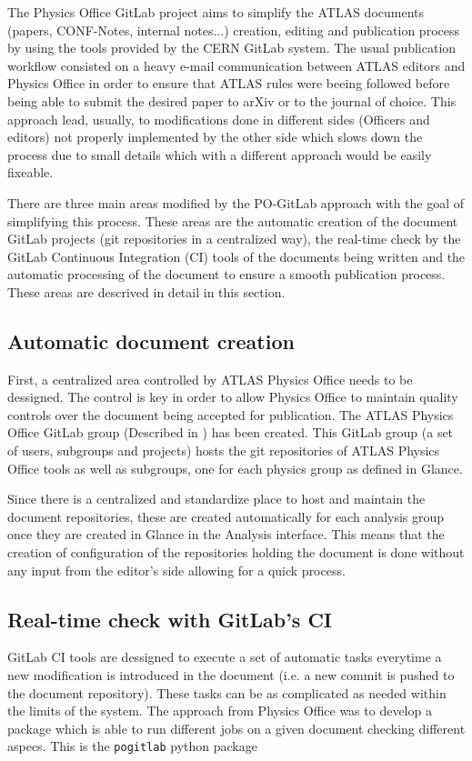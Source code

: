 The Physics Office GitLab project aims to simplify the ATLAS documents (papers, CONF-Notes, internal notes...) creation, editing and publication process by using the tools provided by the CERN GitLab system. The usual publication workflow consisted on a heavy e-mail communication between ATLAS editors and Physics Office in order to ensure that ATLAS rules were beeing followed before being able to submit the desired paper to arXiv or to the journal of choice. This approach lead, usually, to modifications done in different sides (Officers and editors) not properly implemented by the other side which slows down the process due to small details which with a different approach would be easily fixeable.

There are three main areas modified by the PO-GitLab approach with the goal of simplifying this process. These areas are the automatic creation of the document GitLab projects (git repositories in a centralized way), the real-time check by the GitLab Continuous Integration (CI) tools of the documents being written and the automatic processing of the document to ensure a smooth publication process. These areas are descrived in detail in this section.

\subsection{Automatic document creation}
First, a centralized area controlled by ATLAS Physics Office needs to be dessigned. The control is key in order to allow Physics Office to maintain quality controls over the document being accepted for publication. The ATLAS Physics Office GitLab group (Described in \Sect{\ref{sec:pogitlab-group}}) has been created. This GitLab group (a set of users, subgroups and projects) hosts the git repositories of ATLAS Physics Office tools as well as subgroups, one for each physics group as defined in Glance.

Since there is a centralized and standardize place to host and maintain the document repositories, these are created automatically for each analysis group once they are created in Glance in the Analysis interface. This means that the creation of configuration of the repositories holding the document is done without any input from the editor's side allowing for a quick process.

\subsection{Real-time check with GitLab's CI}
GitLab CI tools are dessigned to execute a set of automatic tasks everytime a new modification is introduced in the document (i.e. a new commit is pushed to the document repository). These tasks can be as complicated as needed within the limits of the system. The approach from Physics Office was to develop a package which is able to run different jobs on a given document checking different aspecs. This is the \texttt{pogitlab} python package~\cite{pogitlab-repo}

